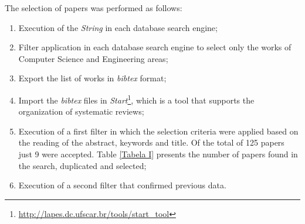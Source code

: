 The selection of papers was performed as follows:
 \begin{enumerate}

\item Execution of the \textit{String} in each database search engine;
\item Filter application in each database search engine to select only the works of Computer Science and Engineering areas;
\item Export the list of works in \textit{bibtex} format;
\item Import the \textit{bibtex} files in \textit{Start}\footnote{\url{http://lapes.dc.ufscar.br/tools/start_tool}}, which is a tool that supports the organization of systematic reviews;
\item Execution of a first filter in which the selection criteria were applied based on the reading of the abstract, keywords and title. Of the total of 125 papers just 9 were accepted. Table \ref{Tabela I} presents the number of papers found in the search, duplicated and selected;
\item Execution of a second filter that confirmed previous data.

 \end{enumerate}

